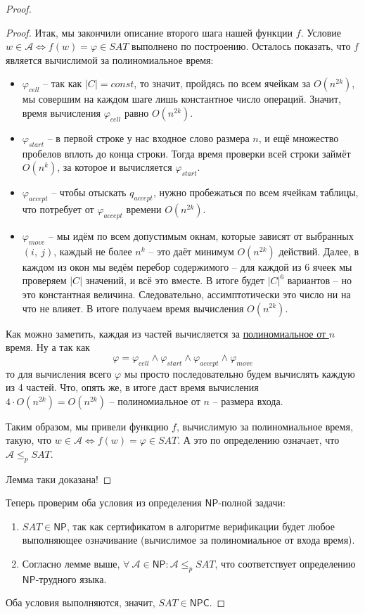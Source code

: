 \documentclass[a4paper,12pt]{article}
\newcommand{\NPclass}{\mathsf{NP}}
\newcommand{\NPCclass}{\mathsf{NPC}}
\begin{document}
\begin{proof}
\begin{proof}
    Итак, мы закончили описание второго шага нашей функции $f$. Условие $w \in \mathscr{A} \Longleftrightarrow f(w) = \varphi \in SAT$ выполнено по построению. Осталось показать, что $f$ является вычислимой за полиномиальное время:
    \begin{itemize}
        \item $\varphi_{cell}$ -- так как $|C| = const$, то значит, пройдясь по всем ячейкам за $O(n^{2k})$, мы совершим на каждом шаге лишь константное число операций. Значит, время вычисления $\varphi_{cell}$ равно $O(n^{2k})$.
        \item $\varphi_{start}$ -- в первой строке у нас входное слово размера $n$, и ещё множество пробелов вплоть до конца строки. Тогда время проверки всей строки займёт $O(n^k)$, за которое и вычисляется $\varphi_{start}$.
        \item $\varphi_{accept}$ -- чтобы отыскать $q_{accept}$, нужно пробежаться по всем ячейкам таблицы, что потребует от $\varphi_{accept}$ времени $O(n^{2k})$.
        \item $\varphi_{move}$ -- мы идём по всем допустимым окнам, которые зависят от выбранных $(i,\ j)$, каждый не более $n^k$ -- это даёт минимум $O(n^{2k})$ действий. Далее, в каждом из окон мы ведём перебор содержимого -- для каждой из 6 ячеек мы проверяем $|C|$ значений, и всё это вместе. В итоге будет $|C|^6$ вариантов -- но это константная величина. Следовательно, ассимптотически это число ни на что не влияет. В итоге получаем время вычисления $O(n^{2k})$.
    \end{itemize}
    Как можно заметить, каждая из частей вычисляется за \underline{полиномиальное от $n$} время. Ну а так как\[\varphi = \varphi_{cell} \wedge \varphi_{start} \wedge \varphi_{accept} \wedge \varphi_{move}\] то для вычисления всего $\varphi$ мы просто последовательно будем вычислять каждую из 4 частей. Что, опять же, в итоге даст время вычисления $4 \cdot O(n^{2k}) = O(n^{2k})$ -- полиномиальное от $n$ -- размера входа.
    
    Таким образом, мы привели функцию $f$, вычислимую за полиномиальное время, такую, что $w \in \mathscr{A} \Longleftrightarrow f(w) = \varphi \in SAT$. А это по определению означает, что $\mathscr{A} \leqslant_p SAT$.
    
    Лемма таки доказана!
    \end{proof}
    Теперь проверим оба условия из определения $\NPclass$-полной задачи:
    \begin{enumerate}
        \item $SAT \in \NPclass$, так как сертификатом в алгоритме верификации будет любое выполняющее означивание (вычислимое за полиномиальное от входа время).
        \item Согласно лемме выше, $\forall\ \mathscr{A} \in \NPclass: \mathscr{A} \leqslant_p SAT$, что соответствует определению $\NPclass$-трудного языка.
    \end{enumerate}
    Оба условия выполняются, значит, $SAT \in \NPCclass$.
\end{proof}
\end{document}
